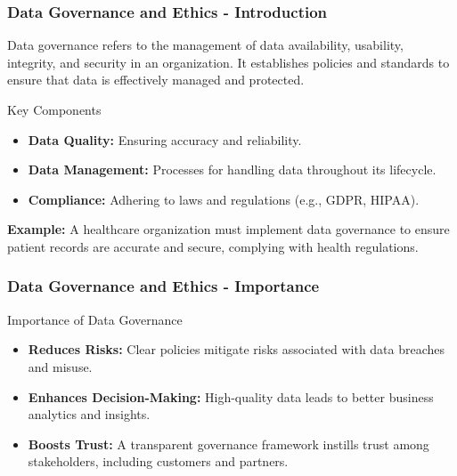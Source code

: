 \documentclass[aspectratio=169]{beamer}
\begin{document}
\begin{frame}[fragile]
    \frametitle{Data Governance and Ethics - Introduction}
    Data governance refers to the management of data availability, usability, integrity, and security in an organization. It establishes policies and standards to ensure that data is effectively managed and protected.
    
    \begin{block}{Key Components}
        \begin{itemize}
            \item \textbf{Data Quality:} Ensuring accuracy and reliability.
            \item \textbf{Data Management:} Processes for handling data throughout its lifecycle.
            \item \textbf{Compliance:} Adhering to laws and regulations (e.g., GDPR, HIPAA).
        \end{itemize}
    \end{block}
    
    \textbf{Example:} A healthcare organization must implement data governance to ensure patient records are accurate and secure, complying with health regulations.
\end{frame}

\begin{frame}[fragile]
    \frametitle{Data Governance and Ethics - Importance}
    \begin{block}{Importance of Data Governance}
        \begin{itemize}
            \item \textbf{Reduces Risks:} Clear policies mitigate risks associated with data breaches and misuse.
            \item \textbf{Enhances Decision-Making:} High-quality data leads to better business analytics and insights.
            \item \textbf{Boosts Trust:} A transparent governance framework instills trust among stakeholders, including customers and partners.
        \end{itemize}
    \end{block}
\end{frame}
\end{document}
